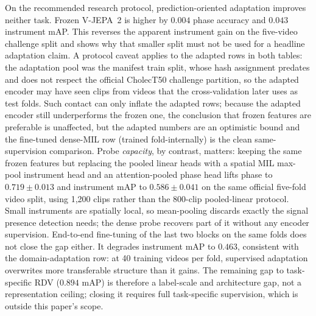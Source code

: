 \documentclass[preprint,12pt]{elsarticle}
\begin{document}
On the recommended research protocol, prediction-oriented adaptation improves
neither task. Frozen V-JEPA~2 is higher by $0.004$ phase accuracy and $0.043$
instrument mAP. This reverses the apparent instrument gain on the five-video
challenge split and shows why that smaller split must not be used for a
headline adaptation claim.
A protocol caveat applies to the adapted rows in both tables: the adaptation
pool was the manifest train split, whose hash assignment predates and does not
respect the official CholecT50 challenge partition, so the adapted encoder may
have seen clips from videos that the cross-validation later uses as test folds.
Such contact can only inflate the adapted rows; because the adapted encoder
still underperforms the frozen one, the conclusion that frozen features are
preferable is unaffected, but the adapted numbers are an optimistic bound and
the fine-tuned dense-MIL row (trained fold-internally) is the clean
same-supervision comparison.
Probe \emph{capacity}, by contrast, matters: keeping the same frozen features
but replacing the pooled linear heads with a spatial MIL max-pool instrument
head and an attention-pooled phase head lifts phase to $0.719{\pm}0.013$ and
instrument mAP to $0.586{\pm}0.041$ on the same official five-fold video
split, using 1{,}200 clips rather than the 800-clip pooled-linear protocol.
Small instruments are spatially local, so mean-pooling discards exactly the
signal presence detection needs; the dense probe recovers part of it without
any encoder supervision. End-to-end fine-tuning of the last two blocks on the
same folds does not close the gap either. It degrades instrument mAP to
$0.463$, consistent with the domain-adaptation row: at 40 training videos per
fold, supervised adaptation overwrites more transferable structure than it
gains. The remaining gap to task-specific RDV
($0.894$ mAP) is therefore a label-scale and architecture gap, not a
representation ceiling; closing it requires full task-specific supervision,
which is outside this paper's scope.
\end{document}
